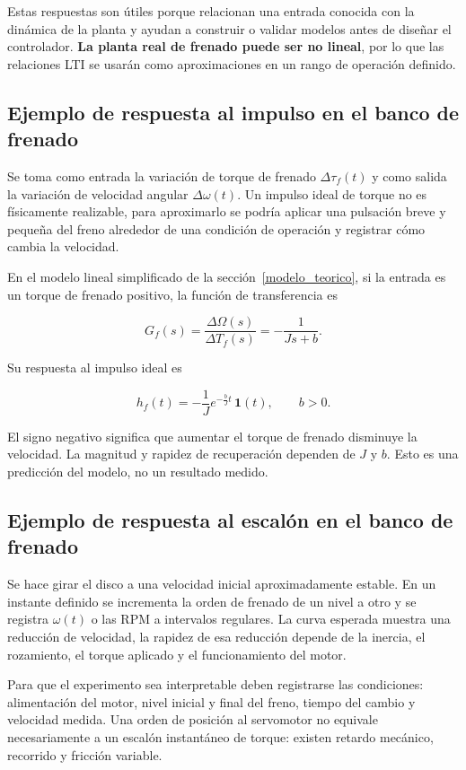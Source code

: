 \documentclass[9pt,a4paper,twocolumn]{extarticle}
\begin{document}
Estas respuestas son útiles porque relacionan una entrada conocida con
la dinámica de la planta y ayudan a construir o validar modelos antes de
diseñar el controlador. \textbf{La planta real de frenado puede ser no
lineal}, por lo que las relaciones LTI se usarán como aproximaciones en
un rango de operación definido.

\subsection{Ejemplo de respuesta al impulso en el banco de
frenado}\label{ejemplo-de-respuesta-al-impulso-en-el-banco-de-frenado}

Se toma como entrada la variación de torque de frenado
\(\Delta\tau_f(t)\) y como salida la variación de velocidad
angular \(\Delta\omega(t)\). Un impulso ideal de torque no es
físicamente realizable, para aproximarlo se podría aplicar una
pulsación breve y pequeña del freno alrededor de una condición
de operación y registrar cómo cambia la velocidad.

En el modelo lineal simplificado de la sección~\ref{modelo_teorico}, si la entrada es un
torque de frenado positivo, la función de transferencia es

\[
G_f(s)=\frac{\Delta\Omega(s)}{\Delta T_f(s)}=-\frac{1}{Js+b}.
\]

Su respuesta al impulso ideal es

\[
h_f(t)=-\frac{1}{J}e^{-\frac{b}{J}t}\,\mathbf{1}(t),\qquad b>0.
\]

El signo negativo significa que aumentar el torque de frenado disminuye
la velocidad. La magnitud y rapidez de recuperación dependen de \(J\) y
\(b\). Esto es una predicción del modelo, no un resultado
medido.

\subsection{Ejemplo de respuesta al escalón en el banco de
frenado}\label{ejemplo-de-respuesta-al-escaluxf3n-en-el-banco-de-frenado}

Se hace girar el disco a una velocidad inicial aproximadamente estable.
En un instante definido se incrementa la orden de frenado de un nivel a
otro y se registra \(\omega(t)\) o las RPM a intervalos regulares. La
curva esperada muestra una reducción de velocidad, la rapidez de esa
reducción depende de la inercia, el rozamiento, el torque aplicado y el
funcionamiento del motor.

Para que el experimento sea interpretable deben registrarse las
condiciones: alimentación del motor, nivel inicial y final del freno,
tiempo del cambio y velocidad medida. Una orden de posición al
servomotor no equivale necesariamente a un escalón instantáneo de
torque: existen retardo mecánico, recorrido y fricción variable.
\end{document}
